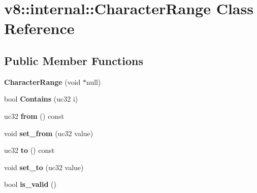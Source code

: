 \hypertarget{classv8_1_1internal_1_1_character_range}{}\section{v8\+:\+:internal\+:\+:Character\+Range Class Reference}
\label{classv8_1_1internal_1_1_character_range}
\subsection*{Public Member Functions}
\begin{DoxyCompactItemize}
\item 
{\bfseries Character\+Range} (void $\ast$null)\hypertarget{classv8_1_1internal_1_1_character_range_a1c257176d47561b468f2d9fcba3768ee}{}\label{classv8_1_1internal_1_1_character_range_a1c257176d47561b468f2d9fcba3768ee}

\item 
bool {\bfseries Contains} (uc32 i)\hypertarget{classv8_1_1internal_1_1_character_range_a84c0fb224399883bcb7dd49c7d931300}{}\label{classv8_1_1internal_1_1_character_range_a84c0fb224399883bcb7dd49c7d931300}

\item 
uc32 {\bfseries from} () const \hypertarget{classv8_1_1internal_1_1_character_range_abce6bc9450b763fc91a0f8969c9cf24b}{}\label{classv8_1_1internal_1_1_character_range_abce6bc9450b763fc91a0f8969c9cf24b}

\item 
void {\bfseries set\+\_\+from} (uc32 value)\hypertarget{classv8_1_1internal_1_1_character_range_a043b323901eedeac660aeca2584c74e6}{}\label{classv8_1_1internal_1_1_character_range_a043b323901eedeac660aeca2584c74e6}

\item 
uc32 {\bfseries to} () const \hypertarget{classv8_1_1internal_1_1_character_range_a42cd35551ff9cda1a45dd20017b14cb7}{}\label{classv8_1_1internal_1_1_character_range_a42cd35551ff9cda1a45dd20017b14cb7}

\item 
void {\bfseries set\+\_\+to} (uc32 value)\hypertarget{classv8_1_1internal_1_1_character_range_a730aeee22db49c1f0077fa09fc450564}{}\label{classv8_1_1internal_1_1_character_range_a730aeee22db49c1f0077fa09fc450564}

\item 
bool {\bfseries is\+\_\+valid} ()\hypertarget{classv8_1_1internal_1_1_character_range_a291c287ee7cb98c102dc433db3aac1e6}{}\label{classv8_1_1internal_1_1_character_range_a291c287ee7cb98c102dc433db3aac1e6}


\end{DoxyCompactItemize}
